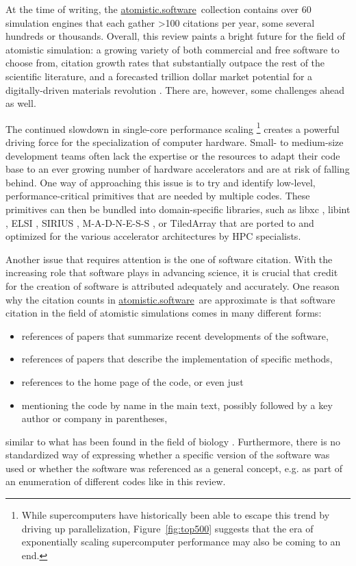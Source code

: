\documentclass[9pt,review,ASAPversion]{livecoms}
\newcommand{\atsoft}{\href{https://atomistic.software}{atomistic.software}\ }
\begin{document}
At the time of writing, the \atsoft collection contains over 60 simulation engines that each gather >100 citations per year, some several hundreds or thousands.
Overall, this review paints a bright future for the field of atomistic simulation: 
a growing variety of both commercial and free software to choose from, citation growth rates that substantially outpace the rest of the scientific literature, and a forecasted trillion dollar market potential for a digitally-driven materials revolution \cite{Satell2019}.
There are, however, some challenges ahead as well.


The continued slowdown in single-core performance scaling%
\footnote{While supercomputers have historically been able to escape this trend by driving up parallelization, Figure~\ref{fig:top500} suggests that the era of exponentially scaling supercomputer performance may also be coming to an end.}
creates a powerful driving force for the specialization of computer hardware.
Small- to medium-size development teams often lack the expertise or the resources to adapt their code base to an ever growing number of hardware accelerators and are at risk of falling behind.
One way of approaching this issue is to try and identify low-level, performance-critical primitives that are needed by multiple codes. 
These primitives can then be bundled into domain-specific libraries, such as libxc \cite{Lehtola2018}, libint \cite{Valeyev2021}, ELSI \cite{Yu2020}, SIRIUS \cite{Sirius2021}, M-A-D-N-E-S-S \cite{Harrison2016}, or TiledArray \cite{Calvin2021} that are ported to and optimized for the various accelerator architectures by HPC specialists.

Another issue that requires attention is the one of software citation.
With the increasing role that software plays in advancing science, it is crucial that credit for the creation of software is attributed adequately and accurately.
One reason why the citation counts in \atsoft are approximate is that software citation in the field of atomistic simulations comes in many different forms: 
\begin{itemize}
    \item references of papers that summarize recent developments of the software,
    \item references of papers that describe the implementation of specific methods,
    \item references to the home page of the code, or even just
    \item mentioning the code by name in the main text, possibly followed by a key author or company in parentheses,
\end{itemize}
similar to what has been found in the field of biology \cite{Howison2016}.
Furthermore, there is no standardized way of expressing whether a specific version of the software was used or whether the software was referenced as a general concept, e.g. as part of an enumeration of different codes like in this review.
\end{document}
